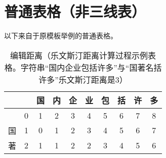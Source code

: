  \section{普通表格（非三线表）}
 
 以下来自于原模板举例的普通表格。
 
 \begin{table}[htbp]
 	\setlength{\belowcaptionskip}{7pt}
 	\centering
 	\caption{编辑距离（乐文斯汀距离计算过程示例表格。字符串``国内企业包括许多''与``国著名括许多''乐文斯汀距离是3）}\label{table:ld}
 	\vspace{0.2cm}
 	\begin{tabular}{|c|c|c|c|c|c|c|c|c|c|}
 		\hline 
 		&   & 国 & 内 & 企 & 业 & 包 & 括 & 许 & 多 \\ 
 		\hline 
 		& 0 & 1 & 2 & 3 & 4 & 5 & 6 & 7 & 8 \\ 
 		\hline 
 		国 & 1 & 0 & 1 & 2 & 3 & 4 & 5 & 6 & 7 \\ 
 		\hline 
 		著 & 2 & 1 & 1 & 2 & 2 & 3 & 4 & 5 & 6 \\ 
 		\hline
 	\end{tabular} 
 \end{table}
